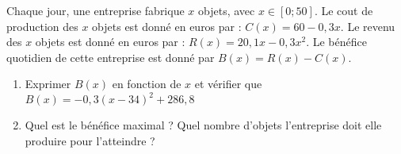 
Chaque jour, une entreprise fabrique $x$ objets, avec $x \in [0 ; 50]$. Le cout de production des $x$ objets est
donné en euros par : $C(x )=60-0,3 x$.
Le revenu des $x$ objets est donné en euros par : $R(x)=20,1 x-0,3 x^2$.
Le bénéfice quotidien de cette entreprise est donné par $B (x )=R (x )-C (x )$.

\begin{enumerate}
\item  Exprimer $B (x )$ en fonction de $x$ et vérifier que $B (x )=-0,3 (x-34)^2+286,8$
\item  Quel est le bénéfice maximal ? Quel nombre d'objets l'entreprise doit elle produire pour
l'atteindre ?
\end{enumerate}

